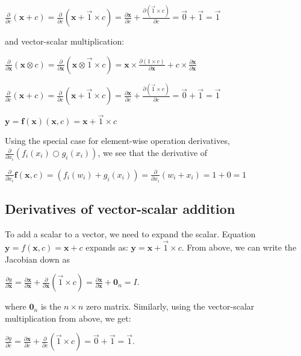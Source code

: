 \documentclass[11pt]{article}
\begin{document}
$\frac{\partial}{\partial c} ( \mathbf{x} + c ) = \frac{\partial}{\partial c} ( \mathbf{x} + \vec{1} \times c ) = \frac{\partial \mathbf{x}}{\partial c} + \frac{\partial (\vec{1} \times c)}{\partial c} = \vec{0} + \vec{1} = \vec{1}$

and vector-scalar multiplication:

$\frac{\partial}{\partial \mathbf{x}} ( \mathbf{x} \otimes c ) = \frac{\partial}{\partial \mathbf{x}} ( \mathbf{x} \otimes \vec{1} \times c ) = \mathbf{x} \times \frac{\partial (1 \times c)}{\partial \mathbf{x}} + c \times \frac{\partial \mathbf{x}}{\partial \mathbf{x}}$

$\frac{\partial}{\partial c} ( \mathbf{x} + c ) = \frac{\partial}{\partial c} ( \mathbf{x} + \vec{1} \times c ) = \frac{\partial \mathbf{x}}{\partial c} + \frac{\partial (\vec{1} \times c)}{\partial c} = \vec{0} + \vec{1} = \vec{1}$



$\mathbf{y} = \mathbf{f(x)}(\mathbf{x},c) = \mathbf{x} + \vec{1} \times c$

Using the special case for element-wise operation derivatives, $\frac{\partial}{\partial x_i} ( f_i(x_i) \bigcirc g_i(x_i) )$, we see that the derivative of

$\frac{\partial}{\partial x_i} \mathbf{f}(\mathbf{x},c) = ( f_{i}(w_i) + g_{i}(x_i) ) = \frac{\partial}{\partial x_i}(w_i + x_i) = 1 + 0 = 1$

\subsection{Derivatives of vector-scalar addition}

To add a scalar to a vector, we need to expand the scalar.  Equation $\mathbf{y} = f(\mathbf{x},c) = \mathbf{x} + c$ expands as: $\mathbf{y} = \mathbf{x} + \vec{1} \times c$.  From above, we can write the Jacobian down as

$
\frac{\partial y}{\partial {\mathbf{x}}} = \frac{\partial \mathbf{x}}{\partial \mathbf{x}} + \frac{\partial}{\partial \mathbf{x}}(\vec{1}\times c) =  \frac{\partial \mathbf{x}}{\partial \mathbf{x}} + \mathbf{0}_n = I.
$

where $\mathbf{0}_{n}$ is the $n \times n$ zero matrix. Similarly, using the vector-scalar multiplication from above, we get:

$\frac{\partial y}{\partial c} = \frac{\partial \mathbf{x}}{\partial c} + \frac{\partial}{\partial c} (\vec{1} \times c) = \vec{0} + \vec{1} = \vec{1}$.
\end{document}
